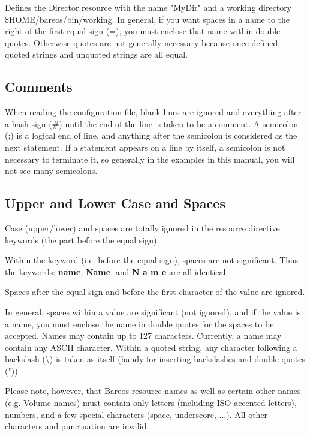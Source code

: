 Defines the Director resource with the name "MyDir" and a working directory
\$HOME/bareos/bin/working. In general, if you want spaces in a name to the
right of the first equal sign (=), you must enclose that name within double
quotes. Otherwise quotes are not generally necessary because once defined,
quoted strings and unquoted strings are all equal.

\label{Comments}
\subsection{Comments}

When reading the configuration file, blank lines are ignored and everything
after a hash sign (\#) until the end of the line is taken to be a comment. A
semicolon (;) is a logical end of line, and anything after the semicolon is
considered as the next statement. If a statement appears on a line by itself,
a semicolon is not necessary to terminate it, so generally in the examples in
this manual, you will not see many semicolons.
\label{Case1}

\subsection{Upper and Lower Case and Spaces}

Case (upper/lower) and spaces are totally ignored in the resource directive
keywords (the part before the equal sign).

Within the keyword (i.e. before the equal sign), spaces are not significant.
Thus the keywords: {\bf name}, {\bf Name}, and {\bf N a m e} are all
identical.

Spaces after the equal sign and before the first character of the value are
ignored.

In general, spaces within a value are significant (not ignored), and if the
value is a name, you must enclose the name in double quotes for the spaces to
be accepted. Names may contain up to 127 characters. Currently, a name may
contain any ASCII character. Within a quoted string, any character following a
backslash (\textbackslash{}) is taken as itself (handy for inserting
backslashes and double quotes (")).

Please note, however, that Bareos resource names as well as certain other
names (e.g. Volume names) must contain only letters (including ISO accented
letters), numbers, and a few special characters (space, underscore, ...).
All other characters and punctuation are invalid.

